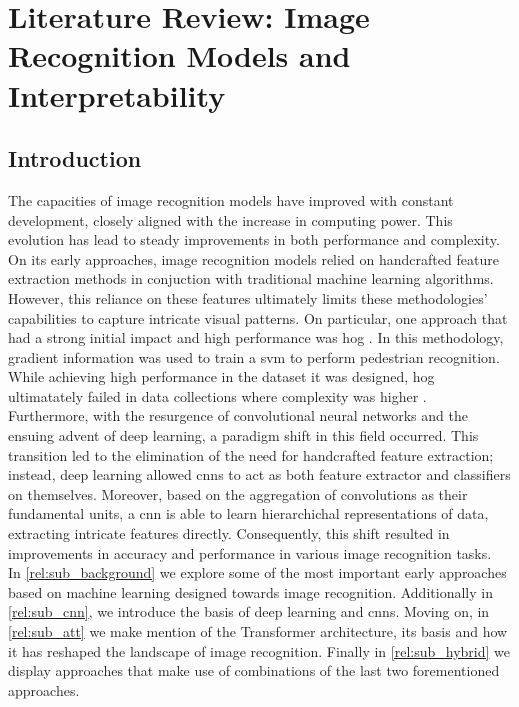 \chapter{Literature Review: Image Recognition Models and Interpretability}
\label{ch:rel}
\chaptertoc{}
\section{Introduction}
The capacities of image recognition models have improved with constant development, 
closely aligned with the increase in computing power. This evolution has lead to steady 
improvements in both performance and complexity. On its early approaches, image recognition models 
relied on handcrafted feature extraction methods  in conjuction with traditional machine learning 
algorithms. However, this reliance on these features ultimately limits these methodologies' 
capabilities to capture intricate visual patterns.
On particular, one approach that had a strong initial impact and high performance was \gls{hog} 
\autocite{dalal2005histograms}. In this methodology, gradient information was used to train a 
\gls{svm} to perform pedestrian recognition. While achieving high performance in the dataset it was 
designed, \gls{hog} ultimatately failed in data collections where complexity was higher 
\autocite{5975165}.\\
Furthermore, with the resurgence of convolutional neural networks and the ensuing advent of 
deep learning, a paradigm shift in this field occurred. This transition led to the elimination of 
the need for handcrafted feature extraction; instead, deep learning allowed \glspl{cnn} to act 
as both feature extractor and classifiers on themselves. Moreover, based on the aggregation of 
convolutions as their fundamental units, a \gls{cnn} is able to learn hierarchichal 
representations of data, extracting intricate features directly. 
Consequently, this shift resulted in improvements in accuracy and performance in various image 
recognition tasks. \\

\noindent In \autoref{rel:sub_background} we explore some of the most important early approaches based 
on machine learning designed towards image recognition. Additionally in \autoref{rel:sub_cnn}, we 
introduce the basis of deep learning and \glspl{cnn}. Moving on, in \autoref{rel:sub_att} we make mention 
of the Transformer architecture, its basis and how it has reshaped the landscape of image 
recognition. Finally in \autoref{rel:sub_hybrid} we display approaches that make use of combinations 
of the last two forementioned approaches.\\


